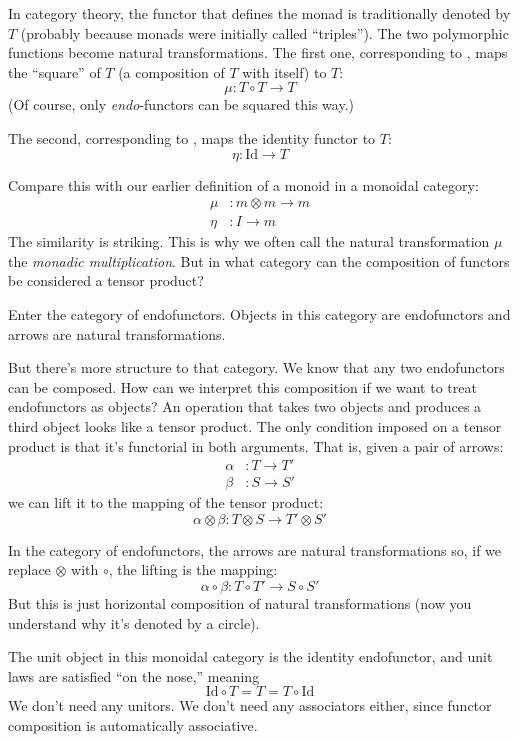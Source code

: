 \documentclass[DaoFP]{subfiles}
\begin{document}
In category theory, the functor that defines the monad is traditionally denoted by $T$ (probably because monads were initially called ``triples''). The two polymorphic functions become natural transformations. The first one, corresponding to , maps the ``square'' of $T$ (a composition of $T$ with itself) to $T$:
\[ \mu \colon T \circ T \to T \]
(Of course, only \emph{endo}-functors can be squared this way.) 

The second, corresponding to , maps the identity functor to $T$:
\[ \eta \colon \text{Id} \to T \]

Compare this with our earlier definition of a monoid in a monoidal category:
\begin{align*}
\mu &\colon m \otimes m \to m \\
\eta &\colon I \to m
\end{align*}
The similarity is striking. This is why we often call the natural transformation $\mu$ the \emph{monadic multiplication}. But in what category can the composition of functors be considered a tensor product? 

Enter the category of endofunctors. Objects in this category are endofunctors and arrows are natural transformations. 

But there's more structure to that category. We know that any two endofunctors can be composed. How can we interpret this composition if we want to treat endofunctors as objects? An operation that takes two objects and produces a third object looks like a tensor product.  The only condition imposed on a tensor product is that it's functorial in both arguments. That is, given a pair of arrows:
\begin{align*}
 \alpha &\colon T \to T' \\
 \beta &\colon S \to S' 
\end{align*}
 we can lift it to the mapping of the tensor product:
 \[ \alpha \otimes \beta \colon T \otimes S \to T' \otimes S' \]
 
 In the category of endofunctors, the arrows are natural transformations so, if we replace $\otimes$ with $\circ$, the lifting is the mapping:
\[ \alpha \circ \beta \colon T \circ T' \to S \circ S' \]
But this is just horizontal composition of natural transformations (now you understand why it's denoted by a circle).

The unit object in this monoidal category is the identity endofunctor, and unit laws are satisfied ``on the nose,'' meaning
\[ \text{Id} \circ T = T = T \circ \text{Id}\]
We don't need any unitors. We don't need any associators either, since functor composition is automatically associative. 
\end{document}
